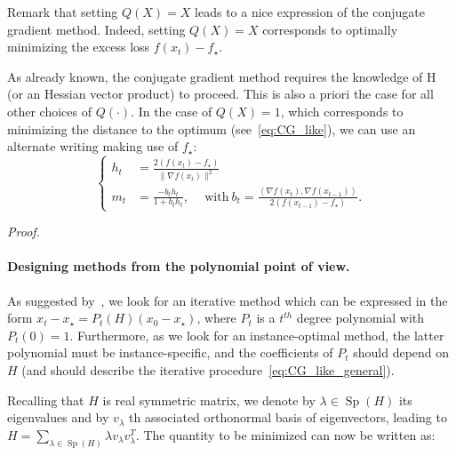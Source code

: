 \documentclass{article}
\def\Sp{\operatorname{Sp}}
\begin{document}
    Remark that setting $Q(X)=X$ leads to a nice expression of the conjugate gradient method.
    Indeed, setting $Q(X)=X$ corresponds to optimally minimizing the excess loss $f(x_t) - f_\star$.

    As already known, the conjugate gradient method requires the knowledge of H (or an Hessian vector product) to proceed.
    This is also a priori the case for all other choices of $Q(\cdot)$.
    In the case of $Q(X) = 1$, which corresponds to minimizing the distance to the optimum (see~\cref{eq:CG_like}), we can use an alternate writing making use of $f_\star$:
    \begin{equation}
        \left\{
            \begin{array}{ll}
                h_t & = \frac{2(f(x_t) - f_\star)}{\|\nabla f(x_t)\|^2} \\
                m_t & = \frac{- b_t h_t}{1 + b_t h_t}, \quad \mathrm{~with~} b_t = \frac{\left<\nabla f(x_t), \nabla f(x_{t-1}) \right>}{2(f(x_{t-1}) - f_\star)}.
            \end{array}
        \right.
    \end{equation}

\noindent \textit{Proof.}

    \paragraph{Designing methods from the polynomial point of view.}

        As suggested by~, we look for an iterative method which can be expressed in the form $x_t - x_\star = P_t(H) (x_0 - x_\star)$, where $P_t$ is a $t^{th}$ degree polynomial with $P_t(0)=1$.
        Furthermore, as we look for an instance-optimal method, the latter polynomial must be instance-specific, and the coefficients of $P_t$ should depend on $H$ (and should describe the iterative procedure~\eqref{eq:CG_like_general}).

        Recalling that $H$ is real symmetric matrix, we denote by $\lambda \in \Sp(H)$ its eigenvalues and by $v_{\lambda}$ th associated orthonormal basis of eigenvectors, leading to $H = \sum_{\lambda\in \Sp(H)} \lambda v_{\lambda} v_{\lambda}^T$.
        The quantity to be minimized can now be written as:
\end{document}
